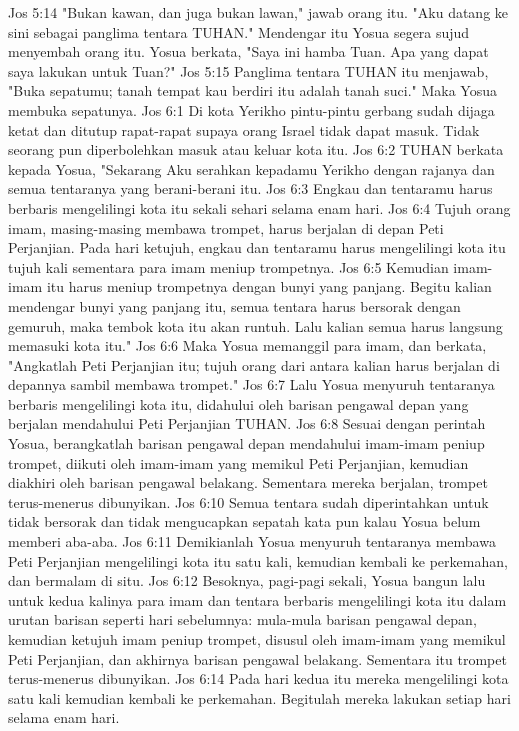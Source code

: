 Jos 5:14  "Bukan kawan, dan juga bukan lawan," jawab orang itu. "Aku datang ke sini sebagai panglima tentara TUHAN." Mendengar itu Yosua segera sujud menyembah orang itu. Yosua berkata, "Saya ini hamba Tuan. Apa yang dapat saya lakukan untuk Tuan?"
Jos 5:15  Panglima tentara TUHAN itu menjawab, "Buka sepatumu; tanah tempat kau berdiri itu adalah tanah suci." Maka Yosua membuka sepatunya.
Jos 6:1  Di kota Yerikho pintu-pintu gerbang sudah dijaga ketat dan ditutup rapat-rapat supaya orang Israel tidak dapat masuk. Tidak seorang pun diperbolehkan masuk atau keluar kota itu.
Jos 6:2  TUHAN berkata kepada Yosua, "Sekarang Aku serahkan kepadamu Yerikho dengan rajanya dan semua tentaranya yang berani-berani itu.
Jos 6:3  Engkau dan tentaramu harus berbaris mengelilingi kota itu sekali sehari selama enam hari.
Jos 6:4  Tujuh orang imam, masing-masing membawa trompet, harus berjalan di depan Peti Perjanjian. Pada hari ketujuh, engkau dan tentaramu harus mengelilingi kota itu tujuh kali sementara para imam meniup trompetnya.
Jos 6:5  Kemudian imam-imam itu harus meniup trompetnya dengan bunyi yang panjang. Begitu kalian mendengar bunyi yang panjang itu, semua tentara harus bersorak dengan gemuruh, maka tembok kota itu akan runtuh. Lalu kalian semua harus langsung memasuki kota itu."
Jos 6:6  Maka Yosua memanggil para imam, dan berkata, "Angkatlah Peti Perjanjian itu; tujuh orang dari antara kalian harus berjalan di depannya sambil membawa trompet."
Jos 6:7  Lalu Yosua menyuruh tentaranya berbaris mengelilingi kota itu, didahului oleh barisan pengawal depan yang berjalan mendahului Peti Perjanjian TUHAN.
Jos 6:8  Sesuai dengan perintah Yosua, berangkatlah barisan pengawal depan mendahului imam-imam peniup trompet, diikuti oleh imam-imam yang memikul Peti Perjanjian, kemudian diakhiri oleh barisan pengawal belakang. Sementara mereka berjalan, trompet terus-menerus dibunyikan.
Jos 6:10  Semua tentara sudah diperintahkan untuk tidak bersorak dan tidak mengucapkan sepatah kata pun kalau Yosua belum memberi aba-aba.
Jos 6:11  Demikianlah Yosua menyuruh tentaranya membawa Peti Perjanjian mengelilingi kota itu satu kali, kemudian kembali ke perkemahan, dan bermalam di situ.
Jos 6:12  Besoknya, pagi-pagi sekali, Yosua bangun lalu untuk kedua kalinya para imam dan tentara berbaris mengelilingi kota itu dalam urutan barisan seperti hari sebelumnya: mula-mula barisan pengawal depan, kemudian ketujuh imam peniup trompet, disusul oleh imam-imam yang memikul Peti Perjanjian, dan akhirnya barisan pengawal belakang. Sementara itu trompet terus-menerus dibunyikan.
Jos 6:14  Pada hari kedua itu mereka mengelilingi kota satu kali kemudian kembali ke perkemahan. Begitulah mereka lakukan setiap hari selama enam hari.
